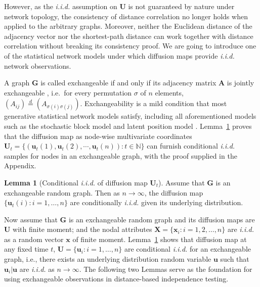 \documentclass[11pt]{article}
\theoremstyle{definition}
\newtheorem{lemma}[theorem]{Lemma}
\begin{document}
	However, as the \textit{i.i.d.} assumption on $\mathbf{U}$ is not guaranteed by nature under network topology, the consistency of distance correlation no longer holds when applied to the arbitrary graphs. Moreover, neither the Euclidean distance of the adjacency vector nor the shortest-path distance can work together with distance correlation without breaking its consistency proof. We are going to introduce one of the statistical network models under which diffusion maps provide \textit{i.i.d.} network observations. 
	
	A graph $\mathbf{G}$ is called exchangeable if and only if its adjacency matrix $\mathbf{A}$ is jointly exchangeable \cite{orbanz2015bayesian}, i.e.~for every permutation $\sigma$ of $n$ elements, $(A_{ij}) \stackrel{d}{=} (A_{\sigma(i) \sigma(j)})$. Exchangeability is a mild condition that most generative statistical network models satisfy, including all aforementioned models such as the stochastic block model and latent position model \cite{rohe2011spectral, sussman2014consistent, todeschini2016exchangeable}. Lemma~\ref{main_lemma} proves that the diffusion map as node-wise multivariate coordinates $ \mathbf{U}_{t} =  \{ (\mathbf{u}_{t}(1), \mathbf{u}_{t}(2), \cdots, \mathbf{u}_{t}(n)   )    : t \in \mathbb{N} \}$ can furnish conditional \textit{i.i.d.} samples for nodes in an exchangeable graph, with the proof supplied in the Appendix.
	\begin{lemma}[Conditional \textit{i.i.d.} of diffusion map $\mathbf{U}_{t}$]
		\label{main_lemma}
		Assume that $\mathbf{G}$ is an exchangeable random graph. Then as $n \rightarrow \infty$, the diffusion map $\{ \mathbf{u}_{t}(i) : i = 1, \ldots, n \}$ are conditionally \textit{i.i.d.} given its underlying distribution.  
	\end{lemma}
	
	Now assume that $\mathbf{G}$ is an exchangeable random graph and its diffusion maps are $\mathbf{U}$ with finite moment; and the nodal attributes $\mathbf{X}=\{ \mathbf{x}_{i}: i = 1,2, \ldots, n \}$ are \textit{i.i.d.} as a random vector $\mathbf{x}$ of finite moment. Lemma~\ref{main_lemma} shows that diffusion map at any fixed time $t$, $\mathbf{U} = \{ \mathbf{u}_{i} : i = 1, \ldots, n  \}$ are conditional \textit{i.i.d.} for an exchangeable graph, i.e., there exists an underlying distribution random variable $\mathbf{u}$ such that $\mathbf{u}_{i}|\mathbf{u}$ are \textit{i.i.d.} as $n \rightarrow \infty$. The following two Lemmas serve as the foundation for using exchangeable observations in distance-based independence testing. 
	
\end{document}
